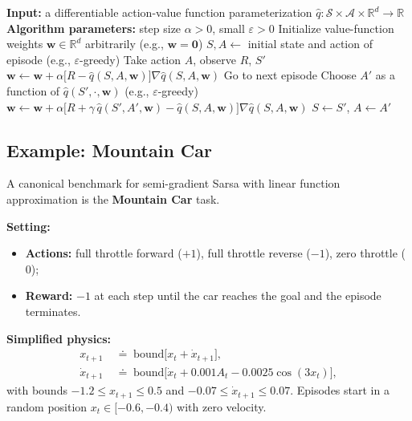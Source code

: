 \documentclass[11pt,a4paper]{article}
\theoremstyle{definition}
\theoremstyle{plain}
\theoremstyle{remark}
\begin{document}
\begin{algorithm}[H]
\caption{Episodic Semi-Gradient Sarsa for Estimating $\hat{q} \approx q_*$}
\begin{algorithmic}
\STATE \textbf{Input:} a differentiable action-value function parameterization $\hat{q} : \mathcal{S} \times \mathcal{A} \times \mathbb{R}^d \to \mathbb{R}$
\STATE \textbf{Algorithm parameters:} step size $\alpha > 0$, small $\varepsilon > 0$
\STATE Initialize value-function weights $\mathbf{w} \in \mathbb{R}^d$ arbitrarily (e.g., $\mathbf{w} = \mathbf{0}$)
    \STATE $S, A \leftarrow$ initial state and action of episode (e.g., $\varepsilon$-greedy)
        \STATE Take action $A$, observe $R$, $S'$
            \STATE $\mathbf{w} \leftarrow \mathbf{w} + \alpha \bigl[R - \hat{q}(S, A, \mathbf{w})\bigr] \nabla \hat{q}(S, A, \mathbf{w})$
            \STATE Go to next episode
        \ENDIF
        \STATE Choose $A'$ as a function of $\hat{q}(S', \cdot, \mathbf{w})$ (e.g., $\varepsilon$-greedy)
        \STATE $\mathbf{w} \leftarrow \mathbf{w} + \alpha \bigl[R + \gamma\, \hat{q}(S', A', \mathbf{w}) - \hat{q}(S, A, \mathbf{w})\bigr] \nabla \hat{q}(S, A, \mathbf{w})$
        \STATE $S \leftarrow S'$, $A \leftarrow A'$
    \ENDFOR
\ENDFOR
\end{algorithmic}
\end{algorithm}

\subsection{Example: Mountain Car}

A canonical benchmark for semi-gradient Sarsa with linear function approximation is the \textbf{Mountain Car} task.

\textbf{Setting:}
\begin{itemize}
    \item \textbf{Actions:} full throttle forward ($+1$), full throttle reverse ($-1$), zero throttle ($0$);
    \item \textbf{Reward:} $-1$ at each step until the car reaches the goal and the episode terminates.
\end{itemize}

\textbf{Simplified physics:}
\begin{align*}
    x_{t+1} \;&\doteq\; \mathrm{bound}\bigl[x_t + \dot{x}_{t+1}\bigr], \\
    \dot{x}_{t+1} \;&\doteq\; \mathrm{bound}\bigl[\dot{x}_t + 0.001 A_t - 0.0025 \cos(3 x_t)\bigr],
\end{align*}
with bounds $-1.2 \leq x_{t+1} \leq 0.5$ and $-0.07 \leq \dot{x}_{t+1} \leq 0.07$. Episodes start in a random position $x_t \in [-0.6, -0.4)$ with zero velocity.
\end{document}
